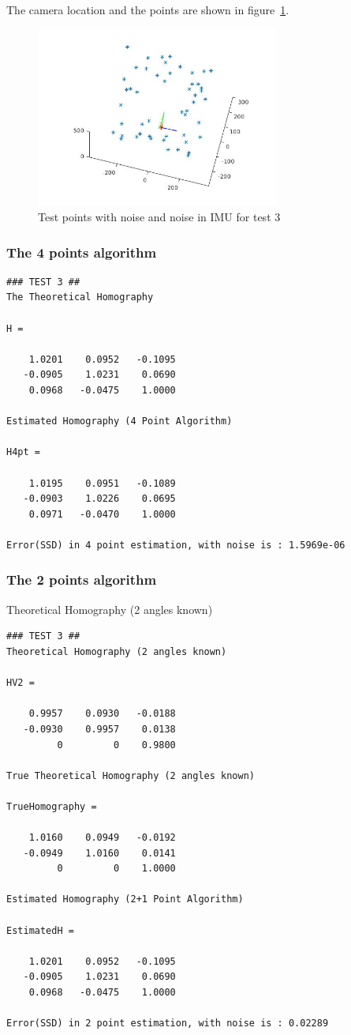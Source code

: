 \documentclass[a4paper,12pt]{article}
\begin{document}
The camera location and the points are shown in figure~\ref{fig:points3}. 

\begin{figure}[tb]
         \centering
         \includegraphics[width=8cm]{Images/points3D-test3.jpg}
         \caption{Test points with noise and noise in IMU for test 3}
 	\label{fig:points3}
\end{figure}
\subsubsection{The 4 points algorithm}
\begin{verbatim}
### TEST 3 ##
The Theoretical Homography

H =

    1.0201    0.0952   -0.1095
   -0.0905    1.0231    0.0690
    0.0968   -0.0475    1.0000

Estimated Homography (4 Point Algorithm)

H4pt =

    1.0195    0.0951   -0.1089
   -0.0903    1.0226    0.0695
    0.0971   -0.0470    1.0000

Error(SSD) in 4 point estimation, with noise is : 1.5969e-06
\end{verbatim}


\subsubsection{The 2 points algorithm}

Theoretical Homography (2 angles known)

\begin{verbatim}
### TEST 3 ##
Theoretical Homography (2 angles known)

HV2 =

    0.9957    0.0930   -0.0188
   -0.0930    0.9957    0.0138
         0         0    0.9800

True Theoretical Homography (2 angles known)

TrueHomography =

    1.0160    0.0949   -0.0192
   -0.0949    1.0160    0.0141
         0         0    1.0000

Estimated Homography (2+1 Point Algorithm)

EstimatedH =

    1.0201    0.0952   -0.1095
   -0.0905    1.0231    0.0690
    0.0968   -0.0475    1.0000

Error(SSD) in 2 point estimation, with noise is : 0.02289
\end{verbatim}
\end{document}
